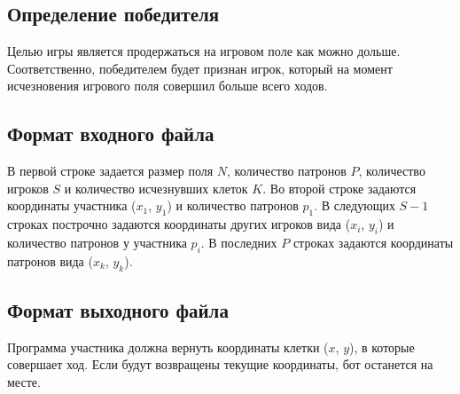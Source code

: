 \documentclass[a4paper,12pt]{article}
\begin{document}
\subsection{Определение победителя}
Целью игры является продержаться на игровом поле как можно дольше. Соответственно, победителем будет признан игрок, который на момент исчезновения игрового поля совершил больше всего ходов.

\subsection{Формат входного файла}
В первой строке задается размер поля $N$, количество патронов $P$, количество игроков $S$ и количество исчезнувших клеток $K$.
Во второй строке задаются координаты участника ($x_1$, $y_1$) и количество патронов $p_1$.
В следующих $S-1$ строках построчно задаются координаты других игроков вида ($x_i$, $y_i$) и количество патронов у участника $p_i$.
В последних $P$ строках задаются координаты патронов вида ($x_k$, $y_k$).

\subsection{Формат выходного файла}
Программа участника должна вернуть координаты клетки ($x$, $y$), в которые совершает ход. Если будут возвращены текущие координаты, бот останется на месте.
\end{document}
